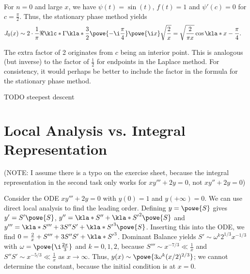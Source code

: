 \documentclass[english, parskip=full]{scrartcl}
\newcommand{\note}[1]{\begin{tcolorbox}[colback=colorbackgroundnote,colframe=colornote, breakable,enhanced]#1\end{tcolorbox}}
\begin{document}
For $n=0$ and large $x$, we have $\psi(t)=\sin(t)$, $f(t)=1$ and $\psi'(c)=0$ for $c=\frac{\pi}{2}$.
Thus, the stationary phase method yields
\begin{align}
J_0(x) &\sim 2\cdot \frac{1}{\pi} \Re \klc*{\Gamma\kla*{\frac{3}{2}} \powe{-\i \frac{\pi}{4}} \powe{\i x} \sqrt{\frac{2}{x}}} = \sqrt{\frac{2}{\pi x}} \cos\kla*{x - \frac{\pi}{4}}.
\end{align}
\note{The extra factor of 2 originates from $c$ being an interior point.
This is analogous (but inverse) to the factor of $\frac{1}{2}$ for endpoints in the Laplace method.
For consistency, it would perhaps be better to include the factor in the formula for the stationary phase method.}
TODO steepest descent
\section{Local Analysis vs. Integral Representation}
(NOTE: I assume there is a typo on the exercise sheet, because the integral representation in the second task only works for $xy'''+2y=0$, not $xy''+2y=0$)

Consider the ODE $xy'''+2y=0$ with $y(0)=1$ and $y(+\infty)=0$.
We can use direct local analysis to find the leading order.
Defining $y=\powe{S}$ gives $y'=S'\powe{S}$, $y''=\kla*{S'' + \kla*{S'}^2}\powe{S}$ and $y'''=\kla*{S''' + 3S''S' + \kla*{S'}^3}\powe{S}$.
Inserting this into the ODE, we find $0 = \frac{2}{x} + S''' + 3S''S' + \kla*{S'}^3$.
Dominant Balance yields $S' \sim \omega^k 2^{1/3} x^{-1/3}$ with $\omega=\powe{\i\frac{2\pi}{3}}$ and $k=0,1,2$, because $S''' \sim x^{-7/3} \ll \frac{1}{x}$ and $S''S' \sim x^{-5/3} \ll \frac{1}{x}$ as $x\rightarrow\infty$.
Thus, $y(x) \sim \powe{3\omega
^k (x/2)^{2/3}}$; we cannot determine the constant, because the initial condition is at $x=0$.
\end{document}

